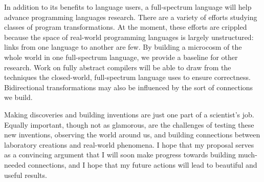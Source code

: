 \documentclass{article}
\begin{document}
In addition to its benefits to language users, a full-spectrum language will help advance programming languages research.
There are a variety of efforts studying classes of program transformations.
At the moment, these efforts are crippled because the space of real-world programming languages is largely unstructured: links from one language to another are few.
By building a microcosm of the whole world in one full-spectrum language, we provide a baseline for other research.
Work on fully abstract compilers will be able to draw from the techniques the closed-world, full-spectrum language uses to ensure correctness.
Bidirectional transformations may also be influenced by the sort of connections we build.



Making discoveries and building inventions are just one part of a scientist's job.
Equally important, though not as glamorous, are the challenges of testing these new inventions, observing the world around us, and building connections between laboratory creations and real-world phenomena.
I hope that my proposal serves as a convincing argument that I will soon make progress towards building much-needed connections, and I hope that my future actions will lead to beautiful and useful results.

\vfill{}
\renewcommand{\section}[2]{}
\begin{multicols}{2}
\tiny


\end{multicols}

\end{document}
